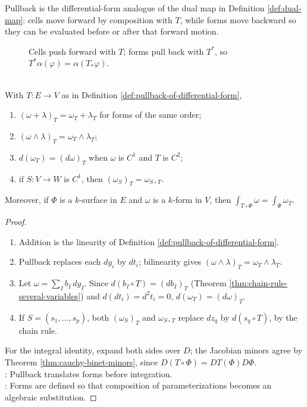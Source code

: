 Pullback is the differential-form analogue of the dual map in Definition \ref{def:dual-map}: cells move forward by composition with $T$, while forms move backward so they can be evaluated before or after that forward motion.

\begin{figure}[H]
  \centering
  
  \caption{Cells push forward with $T$; forms pull back with $T^\ast$, so $T^\ast\alpha(\varphi)=\alpha(T_\ast\varphi)$.}
  \label{fig:forms-pushforward-pullback-duality}
\end{figure}

\begin{theorem} \label{thm:pullback-basic-laws} \\
With $T:E\to V$ as in Definition \ref{def:pullback-of-differential-form},
\begin{enumerate}[label=(\roman*)]
\setlength{\itemsep}{0pt}
\item $(\omega+\lambda)_T=\omega_T+\lambda_T$ for forms of the same order;
\item $(\omega\wedge\lambda)_T=\omega_T\wedge\lambda_T$;
\item $d(\omega_T)=(d\omega)_T$ when $\omega$ is $C^1$ and $T$ is $C^2$;
\item if $S:V\to W$ is $C^1$, then $(\omega_S)_T=\omega_{S\circ T}$.
\end{enumerate}
Moreover, if $\Phi$ is a $k$-surface in $E$ and $\omega$ is a $k$-form in $V$, then $\int_{T\circ\Phi}\omega=\int_{\Phi}\omega_T$.
\begin{proof}
\begin{enumerate}[label=(\roman*)]
\setlength{\itemsep}{0pt}
\item Addition is the linearity of Definition \ref{def:pullback-of-differential-form}.
\item Pullback replaces each $dy_i$ by $dt_i$; bilinearity gives $(\omega\wedge\lambda)_T=\omega_T\wedge\lambda_T$.
\item Let $\omega=\sum_I b_I\,dy_I$. Since $d(b_I\circ T)=(db_I)_T$ (Theorem \ref{thm:chain-rule-several-variables}) and $d(dt_i)=d^2t_i=0$, $d(\omega_T)=(d\omega)_T$.
\item If $S=(s_1,\ldots,s_p)$, both $(\omega_S)_T$ and $\omega_{S\circ T}$ replace $dz_q$ by $d(s_q\circ T)$, by the chain rule.
\end{enumerate}
For the integral identity, expand both sides over $D$; the Jacobian minors agree by Theorem \ref{thm:cauchy-binet-minors}, since $D(T\circ\Phi)=DT(\Phi)D\Phi$.\\
: Pullback translates forms before integration.\\
: Forms are defined so that composition of parameterizations becomes an algebraic substitution.
\end{proof}
\end{theorem}
